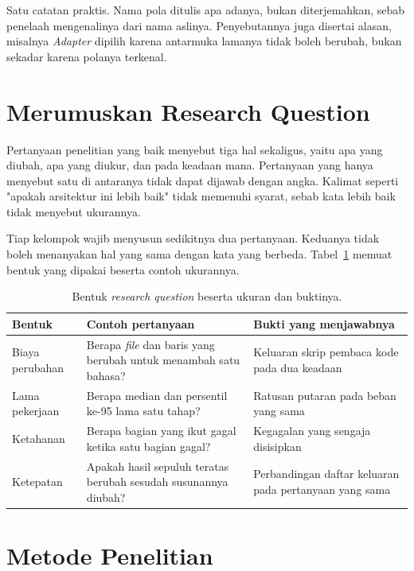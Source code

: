 Satu catatan praktis. Nama pola ditulis apa adanya, bukan diterjemahkan, sebab
penelaah mengenalinya dari nama aslinya. Penyebutannya juga disertai alasan,
misalnya \textit{Adapter} dipilih karena antarmuka
lamanya tidak boleh berubah,
bukan sekadar karena polanya terkenal.

\section{Merumuskan Research Question}

Pertanyaan penelitian yang baik menyebut tiga hal sekaligus, yaitu apa yang
diubah, apa yang diukur, dan pada keadaan mana. Pertanyaan yang hanya menyebut
satu di antaranya tidak dapat dijawab dengan angka. Kalimat seperti "apakah
arsitektur ini lebih baik" tidak memenuhi syarat, sebab kata lebih baik tidak
menyebut ukurannya.

Tiap kelompok wajib menyusun sedikitnya dua pertanyaan. Keduanya tidak boleh
menanyakan hal yang sama dengan kata yang berbeda. Tabel~\ref{tab:bentuk-rq}
memuat bentuk yang dipakai beserta contoh ukurannya.

\begin{table}[htbp]
  \centering
  \caption{Bentuk \textit{research question} beserta ukuran dan buktinya.}
  \label{tab:bentuk-rq}
  \begin{tabularx}{\textwidth}{|l|X|X|}
    \hline
    \textbf{Bentuk} & \textbf{Contoh pertanyaan} & \textbf{Bukti yang menjawabnya} \\
    \hline
    Biaya perubahan & Berapa \textit{file} dan baris yang berubah untuk menambah satu bahasa? & Keluaran skrip pembaca kode pada dua keadaan \\
    \hline
    Lama pekerjaan & Berapa median dan persentil ke-95 lama satu tahap? & Ratusan putaran pada beban yang sama \\
    \hline
    Ketahanan & Berapa bagian yang ikut gagal ketika satu bagian gagal? & Kegagalan yang sengaja disisipkan \\
    \hline
    Ketepatan & Apakah hasil sepuluh teratas berubah sesudah susunannya diubah? & Perbandingan daftar keluaran pada pertanyaan yang sama \\
    \hline
  \end{tabularx}
\end{table}

\section{Metode Penelitian}

